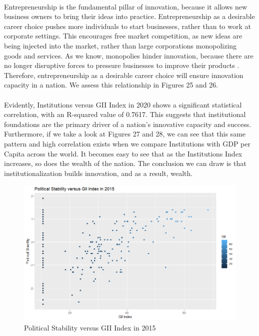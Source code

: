 \documentclass[15pt]{article}
\begin{document}
\\
Entrepreneurship is the fundamental pillar of innovation, because it allows new business owners to bring their ideas into practice. Entrepreneurship as a desirable career choice pushes more individuals to start businesses, rather than to work at corporate settings. This encourages free market competition, as new ideas are being injected into the market, rather than large corporations monopolizing goods and services. As we know, monopolies hinder innovation, because there are no longer disruptive forces to pressure businesses to improve their products \cite{19}. Therefore, entrepreneurship as a desirable career choice will ensure innovation capacity in a nation. We assess this relationship in Figures 25 and 26.\\
\\
Evidently, Institutions versus GII Index in 2020 shows a significant statistical correlation, with an R-squared value of 0.7617. This suggests that institutional foundations are the primary driver of a nation's innovative capacity and success. Furthermore, if we take a look at Figures 27 and 28, we can see that this same pattern and high correlation exists when we compare Institutions with GDP per Capita across the world. It becomes easy to see that as the Institutions Index increases, so does the wealth of the nation. The conclusion we can draw is that institutionalization builds innovation, and as a result, wealth.

\begin{figure}[H]
    \centering
    \includegraphics[scale = 0.7]{Part5_Political.png}
    \caption{Political Stability versus GII Index in 2015}
\end{figure}
\end{document}
